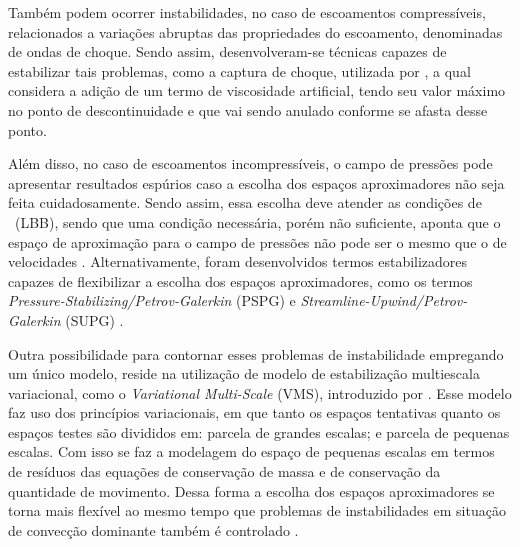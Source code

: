 Também podem ocorrer instabilidades, no caso de escoamentos compressíveis, relacionados a variações abruptas das propriedades do escoamento, denominadas de ondas de choque. Sendo assim, desenvolveram-se técnicas capazes de estabilizar tais problemas, como a captura de choque, utilizada por , a qual considera a adição de um termo de viscosidade artificial, tendo seu valor máximo no ponto de descontinuidade e que vai sendo anulado conforme se afasta desse ponto.

Além disso, no caso de escoamentos incompressíveis, o campo de pressões pode apresentar resultados espúrios caso a escolha dos espaços aproximadores não seja feita cuidadosamente. Sendo assim, essa escolha deve atender as condições de \LBB\ (LBB), sendo que uma condição necessária, porém não suficiente, aponta que o espaço de aproximação para o campo de pressões não pode ser o mesmo que o de velocidades \cite{BrezziF1991,donea2003finite,fernandes2020tecnica}. Alternativamente, foram desenvolvidos termos estabilizadores capazes de flexibilizar a escolha dos espaços aproximadores, como os termos \textit{Pressure-Stabilizing/Petrov-Galerkin} (PSPG) e \textit{Streamline-Upwind/Petrov-Galerkin} (SUPG) \cite{TezduyarS2003}.

Outra possibilidade para contornar esses problemas de instabilidade empregando um único modelo, reside na utilização de modelo de estabilização multiescala variacional, como o \textit{Variational Multi-Scale} (VMS), introduzido por . Esse modelo faz uso dos princípios variacionais, em que tanto os espaços tentativas quanto os espaços testes são divididos em: parcela de grandes escalas; e parcela de pequenas escalas. Com isso se faz a modelagem do espaço de pequenas escalas em termos de resíduos das equações de conservação de massa e de conservação da quantidade de movimento. Dessa forma a escolha dos espaços aproximadores se torna mais flexível ao mesmo tempo que problemas de instabilidades em situação de convecção dominante também é controlado \cite{bazilevs2013computational,sondak2015new}.

